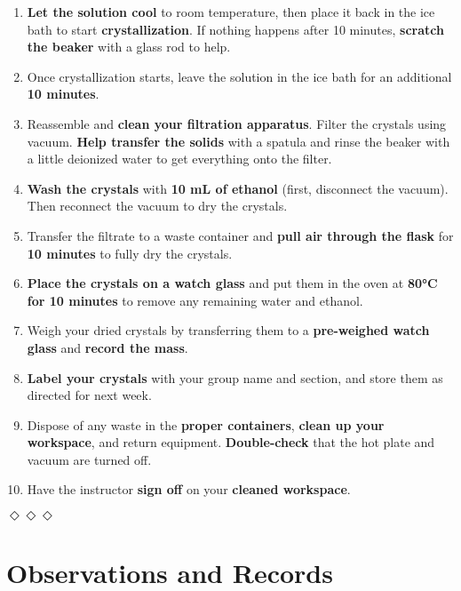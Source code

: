 \documentclass{report}
\begin{document}
\begin{enumerate}
    \item \textbf{Let the solution cool} to room temperature, then place it back in the ice bath to start \textbf{crystallization}. If nothing happens after 10 minutes, \textbf{scratch the beaker} with a glass rod to help.
    \item Once crystallization starts, leave the solution in the ice bath for an additional \textbf{10 minutes}.
    \item Reassemble and \textbf{clean your filtration apparatus}. Filter the crystals using vacuum. \textbf{Help transfer the solids} with a spatula and rinse the beaker with a little deionized water to get everything onto the filter.
    \item \textbf{Wash the crystals} with \textbf{10 mL of ethanol} (first, disconnect the vacuum). Then reconnect the vacuum to dry the crystals.
    \item Transfer the filtrate to a waste container and \textbf{pull air through the flask} for \textbf{10 minutes} to fully dry the crystals.
    \item \textbf{Place the crystals on a watch glass} and put them in the oven at \textbf{80°C for 10 minutes} to remove any remaining water and ethanol.
    \item Weigh your dried crystals by transferring them to a \textbf{pre-weighed watch glass} and \textbf{record the mass}.
    \item \textbf{Label your crystals} with your group name and section, and store them as directed for next week.
    \item Dispose of any waste in the \textbf{proper containers}, \textbf{clean up your workspace}, and return equipment. \textbf{Double-check} that the hot plate and vacuum are turned off.
    \item Have the instructor \textbf{sign off} on your \textbf{cleaned workspace}.
\end{enumerate}

\bigskip
\centerline{$\Diamond\Diamond\Diamond$} %
\bigskip

\section*{Observations and Records}
\end{document}
